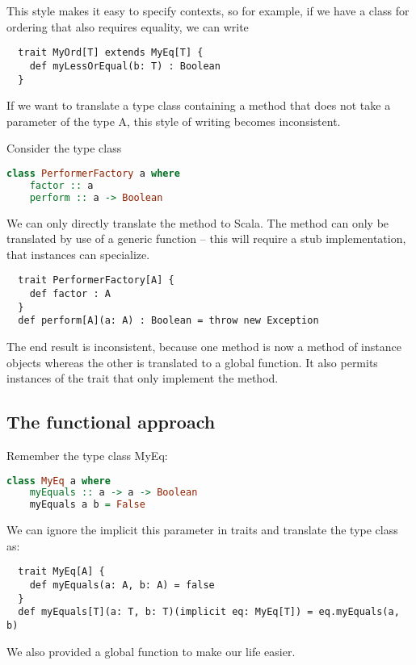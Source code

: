 This style makes it easy to specify contexts, so for example, if we have
a class  for ordering that also requires equality, we can write
\begin{lstlisting}
  trait MyOrd[T] extends MyEq[T] {
    def myLessOrEqual(b: T) : Boolean
  }
\end{lstlisting}

If we want to translate a type class containing a method that does not take a
parameter of the type A, this style of writing becomes inconsistent.

\ex Consider the type class
\begin{lstlisting}[language=Haskell]
  class PerformerFactory a where
    factor :: a
    perform :: a -> Boolean
\end{lstlisting}
We can only directly translate the  method to Scala. The 
method can only be translated by use of a generic function -- this will
require a stub implementation, that instances can specialize.
\begin{lstlisting}
  trait PerformerFactory[A] {
    def factor : A
  }
  def perform[A](a: A) : Boolean = throw new Exception
\end{lstlisting}
The end result is inconsistent, because one method is now a method of
instance objects whereas the other is translated to a global function. It
also permits instances of the trait that only implement the 
method.
\subsection{The functional approach}
Remember the type class MyEq:
\begin{lstlisting}[language=Haskell]
  class MyEq a where
    myEquals :: a -> a -> Boolean
    myEquals a b = False
\end{lstlisting}
We can ignore the implicit this parameter in traits and translate the type
class as:
\begin{lstlisting}
  trait MyEq[A] {
    def myEquals(a: A, b: A) = false
  }
  def myEquals[T](a: T, b: T)(implicit eq: MyEq[T]) = eq.myEquals(a, b)
\end{lstlisting}
We also provided a global  function to make our life easier.

